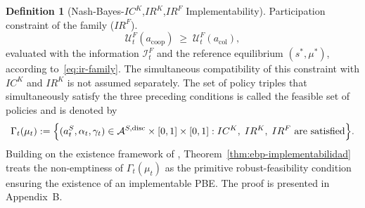 \documentclass[review,authoryear,12pt]{elsarticle}
\theoremstyle{plain}
\theoremstyle{definition}
\newtheorem{definition}[theorem]{Definition}
\newcommand{\1}{\mathbf{1}}
\begin{document}
\begin{definition}[Nash-Bayes-$IC^K$,$IR^K$,$IR^F$ Implementability]
\smallskip
\noindent Participation constraint of the family \textup{(}$IR^F$\textup{)}.
\[
\mathcal{U}^F_t(a_{\mathrm{coop}})\;\ge\;\mathcal{U}^F_t(a_{\mathrm{col}}),
\]
evaluated with the information $\mathcal{I}_t^F$ and the reference equilibrium $(s^\ast,\mu^\ast)$, according to~\eqref{eq:ir-family}.
The simultaneous compatibility of this constraint with $IC^K$ and $IR^K$ is not assumed separately. The set of policy triples that simultaneously satisfy the three preceding conditions is called the feasible set of policies and is denoted by
\begin{equation}
\label{eq:gamma-factible}
\Gamma_t(\mu_t)
:=\Bigl\{(a_t^S,\alpha_t,\gamma_t)\in
\mathcal{A}^{S,\mathrm{disc}}\times[0,1]\times[0,1] :
IC^K,\;IR^K,\;IR^F
\text{ are satisfied}\Bigr\}.
\end{equation}
Building on the existence framework of \citet{KadanRenySwinkels2017}, Theorem~\ref{thm:ebp-implementabilidad} treats the non-emptiness of $\Gamma_t(\mu_t)$ as the primitive robust-feasibility condition ensuring the existence of an implementable PBE. The proof is presented in Appendix~B.
\end{definition}
\end{document}
